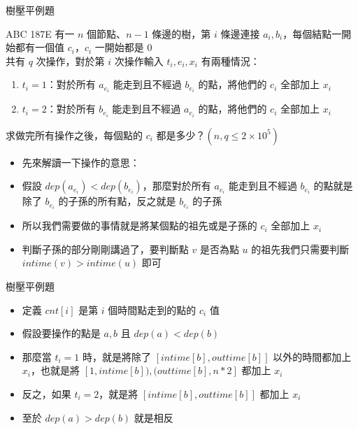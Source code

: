 \documentclass[aspectratio=169]{beamer}
\begin{document}
    \begin{frame}{樹壓平例題}
        \begin{block}{ABC 187E}
            有一 $n$ 個節點、$n-1$ 條邊的樹，第 $i$ 條邊連接 $a_i, b_i$，每個結點一開始都有一個值 $c_i$，$c_i$ 一開始都是 $0$\\
            共有 $q$ 次操作，對於第 $i$ 次操作輸入 $t_i, e_i, x_i$ 有兩種情況：
            \begin{enumerate}
                \item $t_i = 1$：對於所有 $a_{e_i}$ 能走到且不經過 $b_{e_i}$ 的點，將他們的 $c_i$ 全部加上 $x_i$
                \item $t_i = 2$：對於所有 $b_{e_i}$ 能走到且不經過 $a_{e_i}$ 的點，將他們的 $c_i$ 全部加上 $x_i$
            \end{enumerate}
            求做完所有操作之後，每個點的 $c_i$ 都是多少？$(n, q \le 2 \times 10^5)$
        \end{block}

        \begin{itemize}
            \item<1-> 先來解讀一下操作的意思：
            \item<2-> 假設 $dep(a_{e_i}) < dep(b_{e_i})$，那麼對於所有 $a_{e_i}$ 能走到且不經過 $b_{e_i}$ 的點就是除了 $b_{e_i}$ 的子孫的所有點，反之就是 $b_{e_i}$ 的子孫
            \item<3-> 所以我們需要做的事情就是將某個點的祖先或是子孫的 $c_i$ 全部加上 $x_i$
            \item<4-> 判斷子孫的部分剛剛講過了，要判斷點 $v$ 是否為點 $u$ 的祖先我們只需要判斷 $intime(v) > intime(u)$ 即可
        \end{itemize}
    \end{frame}
    
    \begin{frame}{樹壓平例題}
        \begin{itemize}
            \item<1-> 定義 $cnt[i]$ 是第 $i$ 個時間點走到的點的 $c_i$ 值
            \item<1-> 假設要操作的點是 $a, b$ 且 $dep(a) < dep(b)$
            \item<2-> 那麼當 $t_i = 1$ 時，就是將除了 $[intime[b], outtime[b]]$ 以外的時間都加上 $x_i$，也就是將 $[1, intime[b]), (outtime[b], n * 2]$ 都加上 $x_i$
            \item<2-> 反之，如果 $t_i = 2$，就是將 $[intime[b], outtime[b]]$ 都加上 $x_i$
            \item<2-> 至於 $dep(a) > dep(b)$ 就是相反
        \end{itemize}
    \end{frame}
\end{document}
